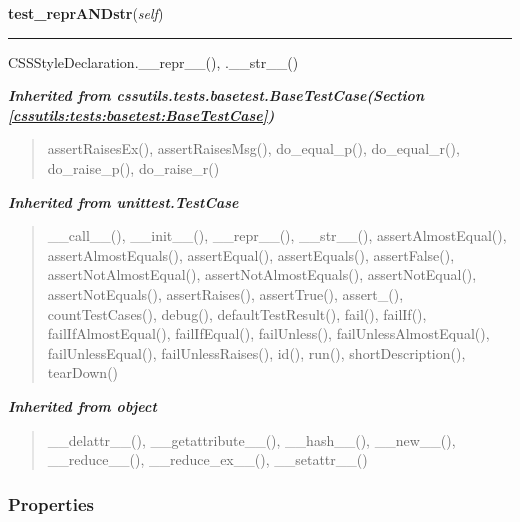     \vspace{0.5ex}

\hspace{.8\funcindent}\begin{boxedminipage}{\funcwidth}

    \raggedright \textbf{test\_reprANDstr}(\textit{self})

    \vspace{-1.5ex}

    \rule{\textwidth}{0.5\fboxrule}
\setlength{\parskip}{2ex}
    CSSStyleDeclaration.\_\_repr\_\_(), .\_\_str\_\_()

\setlength{\parskip}{1ex}
    \end{boxedminipage}


\large{\textbf{\textit{Inherited from cssutils.tests.basetest.BaseTestCase\textit{(Section \ref{cssutils:tests:basetest:BaseTestCase})}}}}

\begin{quote}
assertRaisesEx(), assertRaisesMsg(), do\_equal\_p(), do\_equal\_r(), do\_raise\_p(), do\_raise\_r()
\end{quote}

\large{\textbf{\textit{Inherited from unittest.TestCase}}}

\begin{quote}
\_\_call\_\_(), \_\_init\_\_(), \_\_repr\_\_(), \_\_str\_\_(), assertAlmostEqual(), assertAlmostEquals(), assertEqual(), assertEquals(), assertFalse(), assertNotAlmostEqual(), assertNotAlmostEquals(), assertNotEqual(), assertNotEquals(), assertRaises(), assertTrue(), assert\_(), countTestCases(), debug(), defaultTestResult(), fail(), failIf(), failIfAlmostEqual(), failIfEqual(), failUnless(), failUnlessAlmostEqual(), failUnlessEqual(), failUnlessRaises(), id(), run(), shortDescription(), tearDown()
\end{quote}

\large{\textbf{\textit{Inherited from object}}}

\begin{quote}
\_\_delattr\_\_(), \_\_getattribute\_\_(), \_\_hash\_\_(), \_\_new\_\_(), \_\_reduce\_\_(), \_\_reduce\_ex\_\_(), \_\_setattr\_\_()
\end{quote}


  \subsubsection{Properties}

